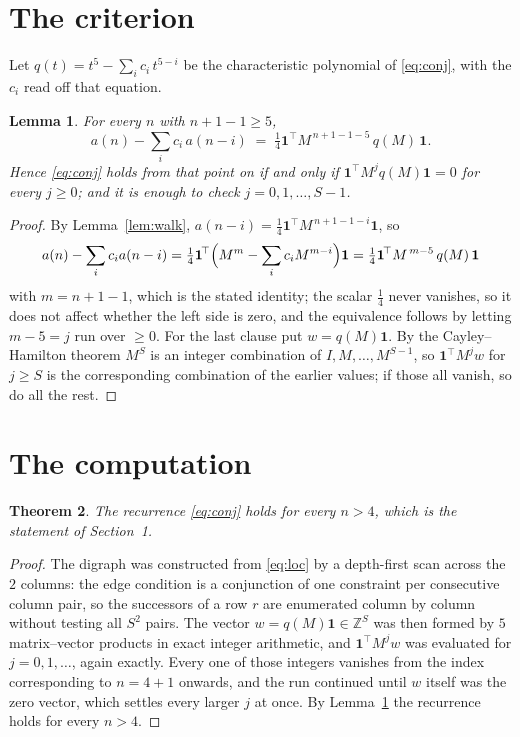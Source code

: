 \documentclass[11pt,a4paper]{article}
\theoremstyle{plain}
\newtheorem{theorem}{Theorem}
\newtheorem{lemma}[theorem]{Lemma}
\theoremstyle{definition}
\begin{document}
\section{The criterion}

Let $q(t)=t^{5}-\sum_i c_i\,t^{5-i}$ be the characteristic polynomial of
\eqref{eq:conj}, with the $c_i$ read off that equation.

\begin{lemma}\label{lem:crit}
For every $n$ with $n+1-1\ge5$,
\[
a(n)-\sum_i c_i\,a(n-i)\;=\;\tfrac1{4}\mathbf{1}^{\!\top}M^{\,n+1-1-5}\,q(M)\,\mathbf{1} .
\]
Hence \eqref{eq:conj} holds from that point on if and only if
$\mathbf{1}^{\!\top}M^{j}q(M)\mathbf{1}=0$ for every $j\ge0$; and it is enough to check
$j=0,1,\dots,S-1$.
\end{lemma}

\begin{proof}
By Lemma~\ref{lem:walk}, $a(n-i)=\tfrac1{4}\mathbf{1}^{\!\top}M^{\,n+1-1-i}\mathbf{1}$, so
\[
a(n)-\sum_i c_i a(n-i)
=\tfrac1{4}\mathbf{1}^{\!\top}\Bigl(M^{m}-\sum_i c_i M^{m-i}\Bigr)\mathbf{1}
=\tfrac1{4}\mathbf{1}^{\!\top}M^{\,m-5}\,q(M)\,\mathbf{1}
\]
with $m=n+1-1$, which is the stated identity; the scalar $\tfrac1{4}$ never vanishes, so it does not affect whether the left side is zero, and the equivalence follows by letting
$m-5=j$ run over $\ge0$. For the last clause put $w=q(M)\mathbf{1}$. By the
Cayley--Hamilton theorem $M^{S}$ is an integer combination of $I,M,\dots,M^{S-1}$, so
$\mathbf{1}^{\!\top}M^{j}w$ for $j\ge S$ is the corresponding combination of the earlier
values; if those all vanish, so do all the rest.
\end{proof}

\section{The computation}

\begin{theorem}
The recurrence \eqref{eq:conj} holds for every $n>4$, which is the statement of
Section~1.
\end{theorem}

\begin{proof}
The digraph was constructed from \eqref{eq:loc} by a depth-first scan across the $2$
columns: the edge condition is a conjunction of one constraint per consecutive column
pair, so the successors of a row $r$ are enumerated column by column without testing all
$S^2$ pairs. The vector $w=q(M)\mathbf{1}\in\mathbb{Z}^{S}$ was then formed by $5$
matrix--vector products in exact integer arithmetic, and $\mathbf{1}^{\!\top}M^{j}w$ was
evaluated for $j=0,1,\dots$, again exactly. Every one of those integers vanishes from the
index corresponding to $n=4+1$ onwards, and the run continued until $w$ itself was the
zero vector, which settles every larger $j$ at once. By Lemma~\ref{lem:crit} the recurrence
holds for every $n>4$.
\end{proof}
\end{document}
